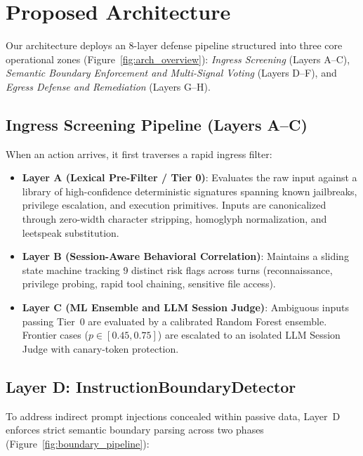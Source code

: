 \documentclass[runningheads]{llncs}
\begin{document}
\section{Proposed Architecture}
\label{sec:architecture}

Our architecture deploys an 8-layer defense pipeline structured into three core operational zones (Figure~\ref{fig:arch_overview}): \textit{Ingress Screening} (Layers A--C), \textit{Semantic Boundary Enforcement and Multi-Signal Voting} (Layers D--F), and \textit{Egress Defense and Remediation} (Layers G--H).

\subsection{Ingress Screening Pipeline (Layers A--C)}
When an action arrives, it first traverses a rapid ingress filter:
\begin{itemize}[leftmargin=*]
    \item \textbf{Layer A (Lexical Pre-Filter / Tier 0)}: Evaluates the raw input against a library of high-confidence deterministic signatures spanning known jailbreaks, privilege escalation, and execution primitives. Inputs are canonicalized through zero-width character stripping, homoglyph normalization, and leetspeak substitution.
    \item \textbf{Layer B (Session-Aware Behavioral Correlation)}: Maintains a sliding state machine tracking 9 distinct risk flags across turns (reconnaissance, privilege probing, rapid tool chaining, sensitive file access).
    \item \textbf{Layer C (ML Ensemble and LLM Session Judge)}: Ambiguous inputs passing Tier~0 are evaluated by a calibrated Random Forest ensemble. Frontier cases ($p \in [0.45, 0.75]$) are escalated to an isolated LLM Session Judge with canary-token protection.
\end{itemize}

\subsection{Layer D: InstructionBoundaryDetector}
\label{sec:boundary_detector}
To address indirect prompt injections concealed within passive data, Layer~D enforces strict semantic boundary parsing across two phases (Figure~\ref{fig:boundary_pipeline}):
\end{document}
